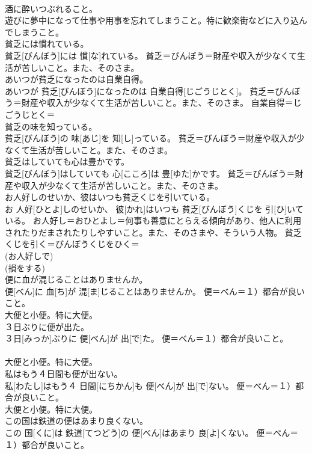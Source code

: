 \documentclass[8pt]{extreport}
\begin{document}
\begin{CJK}{UTF8}{min}
{\\	酒に酔いつぶれること。 　　　　　　　　
\\	遊びに夢中になって仕事や用事を忘れてしまうこと。特に歓楽街などに入り込んでしまうこと。
\\	貧乏には慣れている。	
\\	貧乏[びんぼう]には 慣[な]れている。	貧乏＝びんぼう＝財産や収入が少なくて生活が苦しいこと。また、そのさま。
\\	あいつが貧乏になったのは自業自得。	
\\	あいつが 貧乏[びんぼう]になったのは 自業自得[じごうじとく]。	貧乏＝びんぼう＝財産や収入が少なくて生活が苦しいこと。また、そのさま。 自業自得＝じごうじとく＝ 
\\	貧乏の味を知っている。	
\\	貧乏[びんぼう]の 味[あじ]を 知[し]っている。	貧乏＝びんぼう＝財産や収入が少なくて生活が苦しいこと。また、そのさま。
\\	貧乏はしていても心は豊かです。	
\\	貧乏[びんぼう]はしていても 心[こころ]は 豊[ゆた]かです。	貧乏＝びんぼう＝財産や収入が少なくて生活が苦しいこと。また、そのさま。
\\	お人好しのせいか、彼はいつも貧乏くじを引いている。	
\\	お 人好[ひとよ]しのせいか、 彼[かれ]はいつも 貧乏[びんぼう]くじを 引[ひ]いている。	お人好し＝おひとよし＝何事も善意にとらえる傾向があり、他人に利用されたりだまされたりしやすいこと。また、そのさまや、そういう人物。 貧乏くじを引く＝びんぼうくじをひく＝ 
\\	(お人好しで) 
\\	(損をする) 
\\	便に血が混じることはありませんか。	
\\	便[べん]に 血[ち]が 混[ま]じることはありませんか。	便＝べん＝１）都合が良いこと。 　　　　　
\\	大便と小便。特に大便。
\\	３日ぶりに便が出た。	
\\	３日[みっか]ぶりに 便[べん]が 出[で]た。	便＝べん＝１）都合が良いこと。 　　　　　
\\	大便と小便。特に大便。
\\	私はもう４日間も便が出ない。	
\\	私[わたし]はもう４ 日間[にちかん]も 便[べん]が 出[で]ない。	便＝べん＝１）都合が良いこと。 　　　　　
\\	大便と小便。特に大便。
\\	この国は鉄道の便はあまり良くない。	
\\	この 国[くに]は 鉄道[てつどう]の 便[べん]はあまり 良[よ]くない。	便＝べん＝１）都合が良いこと。 　　　　　
}
\end{CJK}
\end{document}
